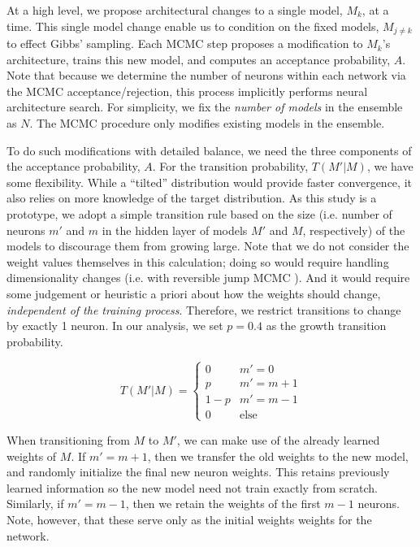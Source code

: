 \documentclass[12pt]{article}
\begin{document}
At a high level, we propose architectural changes to a single model, $M_k$, at a time.  This single model change enable us to condition on the fixed models, $M_{j\neq k}$ to effect Gibbs' sampling.  Each MCMC step proposes a modification to $M_k$'s architecture, trains this new model, and computes an acceptance probability, $A$.  Note that because we determine the number of neurons within each network via the MCMC acceptance/rejection, this process implicitly performs neural architecture search.  For simplicity, we fix the \emph{number of models} in the ensemble as $N$.  The MCMC procedure only modifies existing models in the ensemble.

To do such modifications with detailed balance, we need the three components of the acceptance probability, $A$.  For the transition probability, $T(M'|M)$, we have some flexibility.  While a ``tilted'' distribution would provide faster convergence, it also relies on more knowledge of the target distribution.  As this study is a prototype, we adopt a simple transition rule based on the size (i.e. number of neurons $m'$ and $m$ in the hidden layer of models $M'$ and $M$, respectively) of the models to discourage them from growing large.  Note that we do not consider the weight values themselves in this calculation; doing so would require handling dimensionality changes (i.e. with reversible jump MCMC \cite{green1995reversible}).  And it would require some judgement or heuristic a priori about how the weights should change, \emph{independent of the training process}.  Therefore, we restrict transitions to change by exactly 1 neuron.  In our analysis, we set $p=0.4$ as the growth transition probability.

$$
T(M'|M) = \begin{cases}
			0 & m' = 0 \\
			p & m' = m + 1 \\
			1-p & m' = m - 1 \\
			0 & \text{else} 
\end{cases}
$$

When transitioning from $M$ to $M'$, we can make use of the already learned weights of $M$.  If $m' = m+1$, then we transfer the old weights to the new model, and randomly initialize the final new neuron weights.  This retains previously learned information so the new model need not train exactly from scratch.  Similarly, if $m' = m-1$, then we retain the weights of the first $m-1$ neurons.  Note, however, that these serve only as the initial weights weights for the network.
\end{document}
